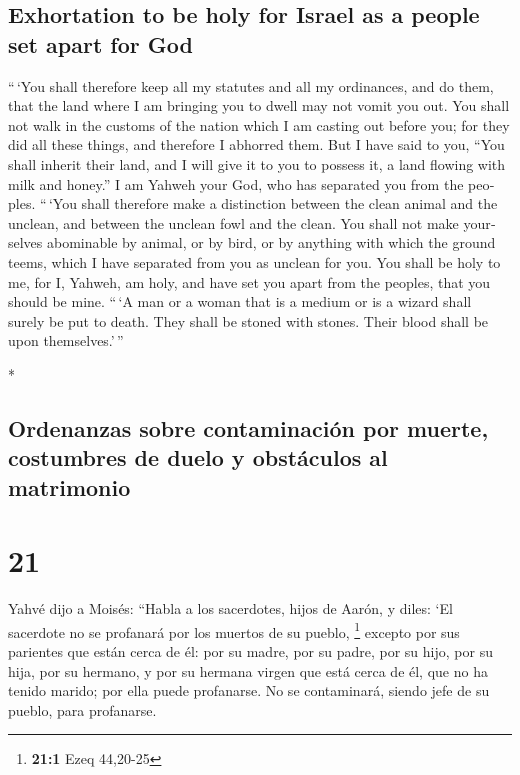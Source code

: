 \begin{paracol}{2}
\begin{otherlanguage}{english}
\hypertarget{exhortation-to-be-holy-for-israel-as-a-people-set-apart-for-god}{%
\subsection{Exhortation to be holy for Israel as a people set apart for
God}\label{exhortation-to-be-holy-for-israel-as-a-people-set-apart-for-god}}

 ``\,`You shall therefore keep all my statutes and all my
ordinances, and do them, that the land where I am bringing you to dwell
may not vomit you out.  You shall not walk in the customs
of the nation which I am casting out before you; for they did all these
things, and therefore I abhorred them.  But I have said
to you, ``You shall inherit their land, and I will give it to you to
possess it, a land flowing with milk and honey.'' I am Yahweh your God,
who has separated you from the peoples.  ``\,`You shall
therefore make a distinction between the clean animal and the unclean,
and between the unclean fowl and the clean. You shall not make
yourselves abominable by animal, or by bird, or by anything with which
the ground teems, which I have separated from you as unclean for you.
 You shall be holy to me, for I, Yahweh, am holy, and
have set you apart from the peoples, that you should be mine.
 ``\,`A man or a woman that is a medium or is a wizard
shall surely be put to death. They shall be stoned with stones. Their
blood shall be upon themselves.'\,''

\end{otherlanguage}

\switchcolumn[0]*

\hypertarget{ordenanzas-sobre-contaminaciuxf3n-por-muerte-costumbres-de-duelo-y-obstuxe1culos-al-matrimonio}{%
\subsection{Ordenanzas sobre contaminación por muerte, costumbres de
duelo y obstáculos al
matrimonio}\label{ordenanzas-sobre-contaminaciuxf3n-por-muerte-costumbres-de-duelo-y-obstuxe1culos-al-matrimonio}}

\hypertarget{section-40}{%
\section{21}\label{section-40}}

 Yahvé dijo a Moisés: ``Habla a los sacerdotes, hijos de
Aarón, y diles: `El sacerdote no se profanará por los muertos de su
pueblo, \footnote{\textbf{21:1} Ezeq 44,20-25}  excepto
por sus parientes que están cerca de él: por su madre, por su padre, por
su hijo, por su hija, por su hermano,  y por su hermana
virgen que está cerca de él, que no ha tenido marido; por ella puede
profanarse.  No se contaminará, siendo jefe de su pueblo,
para profanarse.


\end{paracol}

